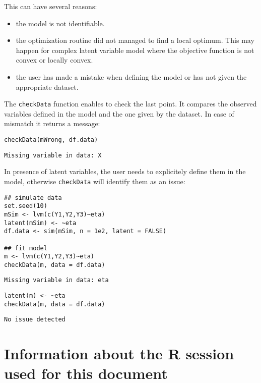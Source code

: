 \documentclass[12pt]{article}
\begin{document}
This can have several reasons:
\begin{itemize}
\item the model is not identifiable.
\item the optimization routine did not managed to find a local
optimum. This may happen for complex latent variable model where the
objective function is not convex or locally convex.
\item the user has made a mistake when defining the model or has not given
the appropriate dataset.
\end{itemize}

The \texttt{checkData} function enables to check the last point. It compares
the observed variables defined in the model and the one given by the
dataset. In case of mismatch it returns a message:
\lstset{language=r,label= ,caption= ,captionpos=b,numbers=none}
\begin{lstlisting}
checkData(mWrong, df.data)
\end{lstlisting}

\begin{verbatim}
Missing variable in data: X
\end{verbatim}

In presence of latent variables, the user needs to explicitely define
them in the model, otherwise \texttt{checkData} will identify them as an
issue:
\lstset{language=r,label= ,caption= ,captionpos=b,numbers=none}
\begin{lstlisting}
## simulate data
set.seed(10)
mSim <- lvm(c(Y1,Y2,Y3)~eta)
latent(mSim) <- ~eta
df.data <- sim(mSim, n = 1e2, latent = FALSE)

## fit model
m <- lvm(c(Y1,Y2,Y3)~eta)
checkData(m, data = df.data)
\end{lstlisting}

\begin{verbatim}
Missing variable in data: eta
\end{verbatim}

\lstset{language=r,label= ,caption= ,captionpos=b,numbers=none}
\begin{lstlisting}
latent(m) <- ~eta
checkData(m, data = df.data)
\end{lstlisting}

\begin{verbatim}
No issue detected
\end{verbatim}


\clearpage

\section{Information about the R session used for this document}
\label{sec:org33bfc7b}
\end{document}
